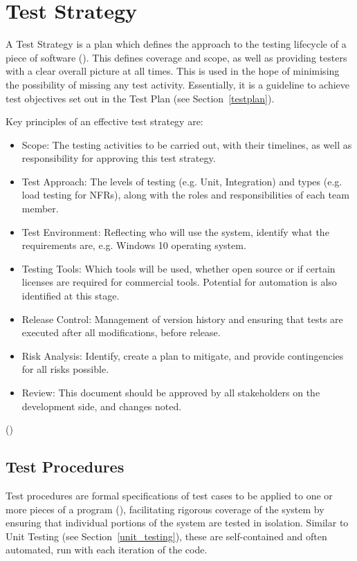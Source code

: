 \documentclass[12pt]{article}
\begin{document}
\section{Test Strategy} \label{test_strategy}

A Test Strategy is a plan which defines the approach to the testing lifecycle of a piece of software (). This defines coverage and scope, as well as providing testers with a clear overall picture at all times. This is used in the hope of minimising the possibility of missing any test activity. Essentially, it is a guideline to achieve test objectives set out in the Test Plan (see Section~\ref{testplan}).

Key principles of an effective test strategy are:

\begin{itemize}
  \item Scope: The testing activities to be carried out, with their timelines, as well as responsibility for approving this test strategy.
  \item Test Approach: The levels of testing (e.g. Unit, Integration) and types (e.g. load testing for NFRs), along with the roles and responsibilities of each team member.
  \item Test Environment: Reflecting who will use the system, identify what the requirements are, e.g. Windows 10 operating system.
  \item Testing Tools: Which tools will be used, whether open source or if certain licenses are required for commercial tools. Potential for automation is also identified at this stage.
  \item Release Control: Management of version history and ensuring that tests are executed after all modifications, before release.
  \item Risk Analysis: Identify, create a plan to mitigate, and provide contingencies for all risks possible.
  \item Review: This document should be approved by all stakeholders on the development side, and changes noted.
\end{itemize}
()


\subsection{Test Procedures}

Test procedures are formal specifications of test cases to be applied to one or more pieces of a program (), facilitating rigorous coverage of the system by ensuring that individual portions of the system are tested in isolation. Similar to Unit Testing (see Section~\ref{unit_testing}), these are self-contained and often automated, run with each iteration of the code. 
\end{document}
